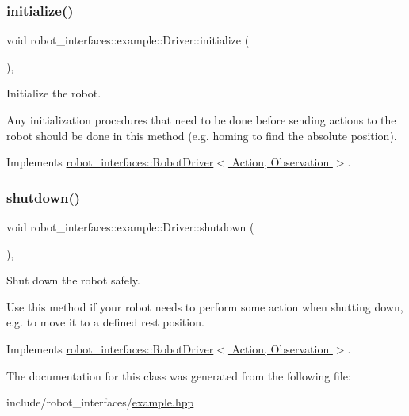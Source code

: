 \subsubsection{\texorpdfstring{initialize()}{initialize()}}
{\footnotesize\ttfamily void robot\+\_\+interfaces\+::example\+::\+Driver\+::initialize (\begin{DoxyParamCaption}{ }\end{DoxyParamCaption})\hspace{0.3cm}{\ttfamily [inline]}, {\ttfamily [virtual]}}



Initialize the robot. 

Any initialization procedures that need to be done before sending actions to the robot should be done in this method (e.\+g. homing to find the absolute position). 

Implements \hyperlink{classrobot__interfaces_1_1RobotDriver_af3cbef570a455e1f8085d701282264ff}{robot\+\_\+interfaces\+::\+Robot\+Driver$<$ Action, Observation $>$}.

\mbox{\label{classrobot__interfaces_1_1example_1_1Driver_a91cbe74896c9ed56ff7eee6380964dfe}} 
\subsubsection{\texorpdfstring{shutdown()}{shutdown()}}
{\footnotesize\ttfamily void robot\+\_\+interfaces\+::example\+::\+Driver\+::shutdown (\begin{DoxyParamCaption}{ }\end{DoxyParamCaption})\hspace{0.3cm}{\ttfamily [inline]}, {\ttfamily [virtual]}}



Shut down the robot safely. 

Use this method if your robot needs to perform some action when shutting down, e.\+g. to move it to a defined rest position. 

Implements \hyperlink{classrobot__interfaces_1_1RobotDriver_a3451fb8b15d2840b559f3ee858de01f8}{robot\+\_\+interfaces\+::\+Robot\+Driver$<$ Action, Observation $>$}.



The documentation for this class was generated from the following file\+:\begin{DoxyCompactItemize}
\item 
include/robot\+\_\+interfaces/\hyperlink{example_8hpp}{example.\+hpp}\end{DoxyCompactItemize}
